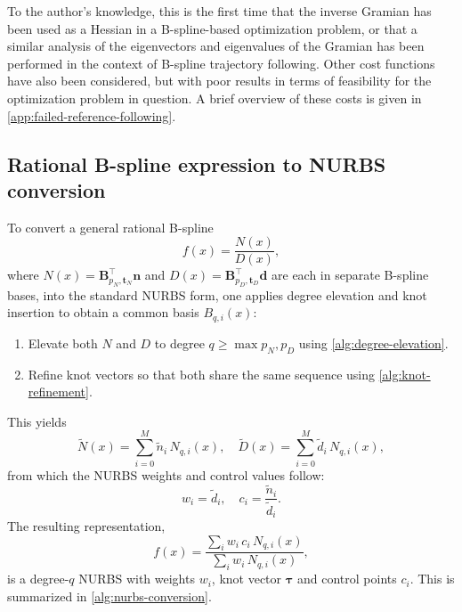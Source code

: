To the author's knowledge, this is the first time that the inverse Gramian has been used as a Hessian in a B-spline-based optimization problem, or that a similar analysis of the eigenvectors and eigenvalues of the Gramian has been performed in the context of B-spline trajectory following. Other cost functions have also been considered, but with poor results in terms of feasibility for the optimization problem in question. A brief overview of these costs is given in \cref{app:failed-reference-following}.



\FloatBarrier
\subsection{Rational B-spline expression to NURBS conversion}\label{sec:nurbs-conversion}


To convert a general rational B-spline
$$
    f(x) = \frac{N(x)}{D(x)},
$$
where $N(x)=\mathbf B_{p_N,\mathbf t_N}^\top\mathbf n$ and $D(x)=\mathbf B_{p_D,\mathbf t_D}^\top\mathbf d$ are each in separate B-spline bases, into the standard NURBS form, one applies degree elevation and knot insertion \citep{Piegl1997} to obtain a common basis ${B_{q,i}(x)}$:
\begin{enumerate}
    \item Elevate both $N$ and $D$ to degree $q\ge\max{p_N,p_D}$ using \cref{alg:degree-elevation}.
    \item Refine knot vectors so that both share the same sequence using \cref{alg:knot-refinement}.
\end{enumerate}
This yields
$$
    \widetilde N(x) = \sum_{i=0}^M \tilde n_i\,N_{q,i}(x),\quad \widetilde D(x) = \sum_{i=0}^M \tilde d_i\,N_{q,i}(x),
$$
from which the NURBS weights and control values follow:
$$
    w_i = \tilde d_i, \quad
    c_i = \frac{\tilde n_i}{\tilde d_i}.
$$
The resulting representation,
$$
    f(x) = \frac{\sum_i w_i\,c_i\,N_{q,i}(x)}{\sum_i w_i\,N_{q,i}(x)},
$$
is a degree-$q$ NURBS with weights $w_i$, knot vector $\boldsymbol{\tau}$ and control points $c_i$. This is summarized in \cref{alg:nurbs-conversion}.

